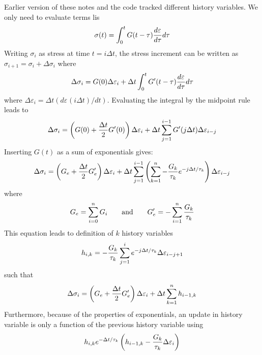 \documentclass[11pt]{article}
\def\e#1{\varepsilon_{#1}}
\def\s#1{\sigma_{#1}}
\begin{document}
Earlier version of these notes and the code tracked different history variables. We only need to evaluate terms lis
\begin{equation}
       \sigma(t) = \int_0^t G(t-\tau) {d\e{}\over d\tau} d\tau        \label{stressterm}
\end{equation}
Writing $\s{i}$ as stress at time $t=i\Delta t$, the stress increment can be written as $\s{i+1}=\s{i}+\Delta \s{i}$ where
\begin{equation}
    \Delta \s{i} = G(0)\Delta \e{i} + \Delta t \int_0^t G'(t-\tau) {d\e{}\over d\tau} d\tau
\end{equation}
where $\Delta \e{i} = \Delta t (d\e{}(i\Delta t)/dt)$. Evaluating the integral by the midpoint rule leads to
\begin{equation}
    \Delta \s{i} = \left(G(0) + {\Delta t\over 2}G'(0)\right)\Delta \e{i} 
                          + \Delta t \sum_{j=1}^{i-1} G'(j\Delta t)\Delta \e{i-j}
\end{equation}
Inserting $G(t)$ as a sum of exponentials gives:
\begin{equation}
    \Delta \s{i} = \left(G_e + {\Delta t\over 2}G_e'\right)\Delta \e{i} 
                          + \Delta t \sum_{j=1}^{i-1}
                            \left(\sum_{k=1}^n -{G_k\over\tau_k} e^{-j\Delta t/\tau_k}\right)\Delta \e{i-j}
\end{equation}
where
\begin{equation}
            G_e = \sum_{i=0}^n G_i     \qquad {\rm and} \qquad     G_e' = -\sum_{i=1}^n {G_k\over\tau_k}
\end{equation}
This equation leads to definition of $k$ history variables
\begin{equation}
      h_{i,k} = -{G_k\over\tau_k}\sum_{j=1}^{i}   e^{-j\Delta t/\tau_k}\Delta \e{i-j+1}
\end{equation}
such that
\begin{equation}
    \Delta \s{i} = \left(G_e + {\Delta t\over 2}G_e'\right)\Delta \e{i} 
                          + \Delta t  \sum_{k=1}^n h_{i-1,k}
\end{equation}
Furthermore, because of the properties of exponentials, an update in history variable is only a function of the previous history variable using
\begin{equation}
        h_{i,k}  e^{-\Delta t/\tau_k}\left(h_{i-1,k} - {G_k\over\tau_k}\Delta \e{i}\right)
\end{equation}
\end{document}
